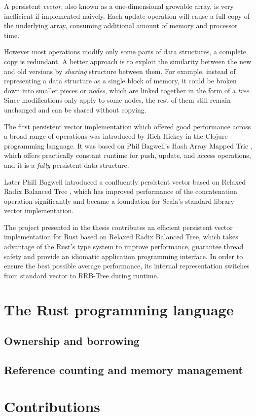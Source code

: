 A persistent \emph{vector}, also known as a one-dimensional growable array, is very inefficient if implemented naively. Each update operation will cause a full copy of the underlying array, consuming additional amount of memory and processor time. 

However most operations modify only some parts of data structures, a complete copy is redundant. A better approach is to exploit the similarity between the new and old versions by \emph{sharing} structure between them. For example, instead of representing a data structure as a single block of memory, it could be broken down into smaller pieces or \emph{nodes}, which are linked together in the form of a \emph{tree}. Since modifications only apply to some nodes, the rest of them still remain unchanged and can be shared without copying. 

The first persistent vector implementation which offered good performance across a broad range of operations was introduced by Rich Hickey in the Clojure programming language. It was based on Phil Bagwell's Hash Array Mapped Trie \cite{ideal-hash-trees}, which offers practically constant runtime for push, update, and access operations, and it is a \emph{fully} persistent data structure. 

Later Phill Bagwell introduced a confluently persistent vector based on Relaxed Radix Balanced Tree \cite{efficient-immutable-vectors}, which has improved performance of the concatenation operation significantly and became a foundation for Scala's standard library vector implementation. 

The project presented in the thesis contributes an efficient persistent vector implementation for Rust based on Relaxed Radix Balanced Tree, which takes advantage of the Rust's type system to improve performance, guarantee thread safety and provide an idiomatic application programming interface. In order to ensure the best possible average performance, its internal representation switches from standard vector to RRB-Tree during runtime. 

\section{The Rust programming language}

\subsection{Ownership and borrowing}

\subsection{Reference counting and memory management}

\section{Contributions}
